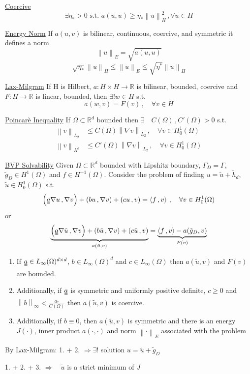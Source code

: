 \documentclass[letterpaper]{article}
\providecommand{\norm}[1]{\left\lVert#1\right\rVert}
\providecommand{\inner}[2]{\left(#1\,,#2\right)}
\providecommand{\ainner}[2]{\left\langle#1\,,#2\right\rangle}
\begin{document}
\begin{multicols}{2}
\uline{Coercive}
\[
\exists\eta_*>0\text{ s.t. }a(u,u)\ge\eta_*\norm{u}_H^2\,,\forall u\in H
\]

\uline{Energy Norm}
If $a(u,v)$ is bilinear, continuous, coercive, and symmetric it defines a norm
\[
\norm{u}_E=\sqrt{a(u,u)}
\]
\[
\sqrt{\eta_*}\norm{u}_H\le\norm{u}_E\le\sqrt{\eta^*}\norm{u}_H
\]

\uline{Lax-Milgram}
If H is Hilbert,
$a:H\times H\rightarrow\mathbb{R}$ is bilinear, bounded, coercive
and $F:H\rightarrow\mathbb{R}$ is linear, bounded, then $\exists! w\in H$ s.t.
\[
a(w,v)=F(v)\,,\quad\forall v\in H
\]

\uline{Poincar\`e Inequality} If $\Omega\subset\mathbb{R}^d$ bounded then
$\exists\quad C(\Omega)\,,C'(\Omega)>0$ s.t.
\begin{align*}
\norm{v}_{L_2}&\le C(\Omega)\norm{\nabla v}_{L_2}\,,\quad\forall v\in
H_0^1(\Omega)\\
\norm{v}_{H^1}&\le C'(\Omega)\norm{\nabla v}_{L_2}\,,\quad\forall v\in
H_0^1(\Omega)
\end{align*}

\uline{BVP Solvability} Given $\Omega\subset\mathbb{R}^d$ bounded with Lipshitz
boundary, $\Gamma_D=\Gamma$, $\tilde g_D\in H^1(\Omega)$ and $f\in
H^{-1}(\Omega)$. Consider the problem of finding $u=\tilde u+\tilde h_d$,
$\tilde u\in H_0^1(\Omega)$ s.t.
\[
\inner{\uuline{a}\nabla u}{\nabla v}+\inner{bu}{\nabla
v}+\inner{cu}{v}=\ainner{f}{v}\,,\quad \forall v\in H_0^1(\Omega)
\]
or 
\[
\underbrace{\inner{\uuline{a}\nabla\tilde u}{\nabla v}+\inner{b\tilde u}{\nabla
v}+\inner{c\tilde u}{v}}_{a(\tilde u,v)}
=\underbrace{\ainner{f}{v}-a(\tilde g_D,v)}_{F(v)}
\]
\begin{enumerate}
\item If $\uuline{a}\in L_\infty(\Omega)^{d\times d}$, $b\in L_\infty(\Omega)^d$
and $c\in L_\infty(\Omega)$ then $a(\tilde u, v)$ and $F(v)$ are bounded.
\item Additionally, if $\uuline{a}$ is symmetric and uniformly positive
definite, $c\ge0$ and $\norm{b}_\infty<\frac{a_*}{C(\Omega)}$ then $a(\tilde
u,v)$ is coercive.
\item Additionally, if $b\equiv 0$, then $a(\tilde u,v)$ is symmetric and there
is an energy $J(\cdot)$, inner product $a(\cdot,\cdot)$ and norm
$\norm{\cdot}_E$ associated with the problem
\end{enumerate}
By Lax-Milgram: 1. + 2. $\Rightarrow\exists!$ solution $u=\tilde u+\tilde g_D$

1. + 2. + 3. $\Rightarrow\quad\tilde u$ is a strict minimum of $J$


\end{multicols}
\end{document}

